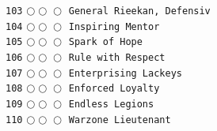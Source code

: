 \documentclass[a4paper,landscape]{article}
\begin{document}
\begin{multicols*}{5}
\texttt{103} \(\bigcirc\!\bigcirc\!\bigcirc\)  \texttt{General Rieekan, Defensiv} \vspace{-0.3mm}\\ 
\texttt{104} \(\bigcirc\!\bigcirc\!\bigcirc\)  \texttt{Inspiring Mentor} \vspace{-0.3mm}\\ 
\texttt{105} \(\bigcirc\!\bigcirc\!\bigcirc\)  \texttt{Spark of Hope} \vspace{-0.3mm}\\ 
\texttt{106} \(\bigcirc\!\bigcirc\!\bigcirc\)  \texttt{Rule with Respect} \vspace{-0.3mm}\\ 
\texttt{107} \(\bigcirc\!\bigcirc\!\bigcirc\)  \texttt{Enterprising Lackeys} \vspace{-0.3mm}\\ 
\texttt{108} \(\bigcirc\!\bigcirc\!\bigcirc\)  \texttt{Enforced Loyalty} \vspace{-0.3mm}\\ 
\texttt{109} \(\bigcirc\!\bigcirc\!\bigcirc\)  \texttt{Endless Legions} \vspace{-0.3mm}\\ 
\texttt{110} \(\bigcirc\!\bigcirc\!\bigcirc\)  \texttt{Warzone Lieutenant} \vspace{-0.3mm}\\ 

\end{multicols*}
\end{document}
